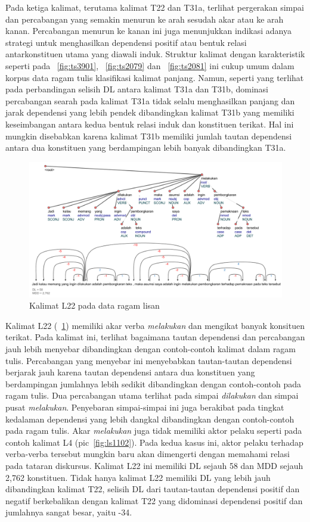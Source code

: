 Pada ketiga kalimat, terutama kalimat T22 dan T31a, terlihat pergerakan simpai dan percabangan yang semakin menurun ke arah sesudah akar atau ke arah kanan. Percabangan menurun ke kanan ini juga menunjukkan indikasi adanya strategi untuk menghasilkan dependensi positif atau bentuk relasi antarkonstituen utama yang diawali induk. Struktur kalimat dengan karakteristik seperti pada \pic~\ref{fig:ts3901}, \pic~\ref{fig:ts2079} dan \pic~\ref{fig:ts2081} ini cukup umum dalam korpus data ragam tulis klasifikasi kalimat panjang. Namun, seperti yang terlihat pada perbandingan selisih DL antara kalimat T31a dan T31b, dominasi percabangan searah pada kalimat T31a tidak selalu menghasilkan panjang dan jarak dependensi yang lebih pendek dibandingkan kalimat T31b yang memiliki keseimbangan antara kedua bentuk relasi induk dan konstituen terikat. Hal ini mungkin disebabkan karena kalimat T31b memiliki jumlah tautan dependensi antara dua konstituen yang berdampingan lebih banyak dibandingkan T31a.

\begin{figure}
	\centering \includegraphics[width=1
	\textwidth] {pics/ls6521.jpg} 
	\caption{Kalimat L22 pada data ragam lisan} 
	\label{fig:ls6521} 
\end{figure}

Kalimat L22 (\pic~\ref{fig:ls6521}) memiliki akar verba \textit{melakukan} dan mengikat banyak konsituen terikat. Pada kalimat ini, terlihat bagaimana tautan dependensi dan percabangan jauh lebih menyebar dibandingkan dengan contoh-contoh kalimat dalam ragam tulis. Percabangan yang menyebar ini menyebabkan tautan-tautan dependensi berjarak jauh karena tautan dependensi antara dua konstituen yang berdampingan jumlahnya lebih sedikit dibandingkan dengan contoh-contoh pada ragam tulis. Dua percabangan utama terlihat pada simpai \textit{dilakukan} dan simpai pusat \textit{melakukan}. Penyebaran simpai-simpai ini juga berakibat pada tingkat kedalaman dependensi yang lebih dangkal dibandingkan dengan contoh-contoh pada ragam tulis. Akar \textit{melakukan} juga tidak memiliki aktor pelaku seperti pada contoh kalimat L4 (pic~\ref{fig:ls1102}). Pada kedua kasus ini, aktor pelaku terhadap verba-verba tersebut mungkin baru akan dimengerti dengan memahami relasi pada tataran diskursus. Kalimat L22 ini memiliki DL sejauh 58 dan MDD sejauh 2,762 konstituen. Tidak hanya kalimat L22 memiliki DL yang lebih jauh dibandingkan kalimat T22, selisih DL dari tautan-tautan dependensi positif dan negatif berkebalikan dengan kalimat T22 yang didominasi dependensi positif dan jumlahnya sangat besar, yaitu -34. 

